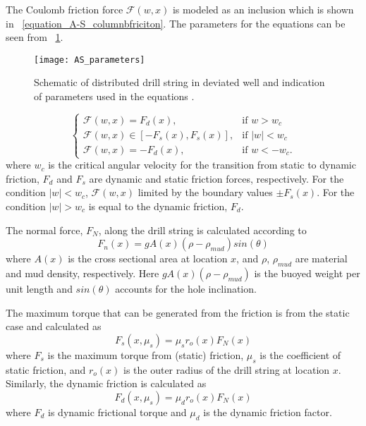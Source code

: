 The Coulomb friction force $\mathcal{F}(w,x)$ is modeled as an inclusion which is shown in \equationname~\ref{equation_A-S_columnbfriciton}. The parameters for the equations can be seen from \figurename~\ref{figure_AS_equation_schematic}.
\begin{figure}
  \centering
  \texttt{[image: AS\_parameters]}
  \caption[Schematic of distributed drill string in deviated well]{Schematic of distributed drill string in deviated well and indication of parameters used in the equations \cite{ref:aarsnes2017a}.}\label{figure_AS_equation_schematic}
\end{figure}
\begin{equation}\label{equation_A-S_columnbfriciton}
  \begin{cases}
     \mathcal{F}(w,x) = F_{d}(x), & \mbox{if } w>w_c \\
     \mathcal{F}(w,x) \in [-F_{s}(x), F_{s}(x)], & \mbox{if } |w|<w_c \ \\
     \mathcal{F}(w,x) = -F_{d}(x), & \mbox{if } w < -w_c.
  \end{cases}
\end{equation}
where $w_c$ is the critical angular velocity for the transition from static to dynamic friction, $F_{d}$ and $F_{s}$ are dynamic and static friction forces, respectively. For the condition $|w|<w_c$, $\mathcal{F}(w,x)$ limited by the boundary values $\pm F_{s}(x)$.  For the condition $|w|>w_c$ is equal to the dynamic friction, $F_{d}$.

The normal force, $F_N$, along the drill string is calculated according to
\begin{equation}\label{equation_AS_normal_force}
  F_n(x) = gA(x)(\rho-\rho_{mud})sin(\theta)
\end{equation}
where $A(x)$ is the cross sectional area at location $x$, and $\rho$, $\rho_{mud}$ are material and mud density, respectively.  Here $gA(x)(\rho-\rho_{mud})$ is the buoyed weight per unit length and $sin(\theta)$ accounts for the hole inclination.

The maximum torque that can be generated from the friction is from the static case and calculated as
\begin{equation}\label{equation_A-S_static_fric}
  F_{s}(x,\mu_s) = \mu_s r_o(x) F_N(x)
\end{equation}
where $F_{s}$ is the maximum torque from (static) friction, $\mu_s$ is the coefficient of static friction, and $r_o(x)$ is the outer radius of the drill string at location $x$. Similarly, the dynamic friction is calculated as
\begin{equation}\label{equation_A-S_dynamic_fric}
  F_{d}(x,\mu_s) = \mu_d r_o(x) F_N(x)
\end{equation}
where $F_d$ is dynamic frictional torque and $\mu_d$ is the dynamic friction factor.

